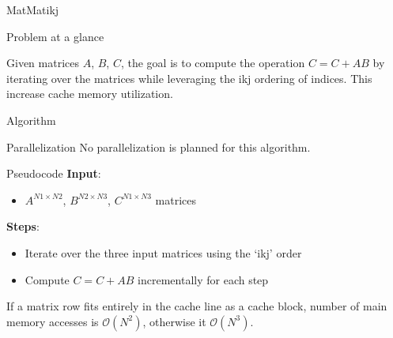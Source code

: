 \begin{chapter}{MatMatikj}
    \begin{section}{Problem at a glance}
        \par Given matrices $A$, $B$, $C$, the goal is to compute the  operation $C = C + AB$ by iterating over the matrices while leveraging the ikj ordering of indices. This increase cache memory utilization.
    \end{section}
    \begin{section}{Algorithm}
        \begin{subsection}{Parallelization}
            No parallelization is planned for this algorithm.
        \end{subsection}
        \begin{subsection}{Pseudocode}
            \textbf{Input}:
            \begin{itemize}
                \item $A^{N1 \times N2}$, $B^{N2 \times N3}$, $C^{N1 \times N3}$ matrices
            \end{itemize}
            \textbf{Steps}:
            \begin{itemize}
                \item Iterate over the three input matrices using the `ikj' order
                \item Compute $C = C + AB$ incrementally for each step
            \end{itemize}
            
        \end{subsection}
    \end{section}
    If a matrix row fits entirely in the cache line as a cache block, number of main memory accesses is $\mathcal{O}(N^2)$, otherwise it $\mathcal{O}(N^3)$.
\end{chapter}